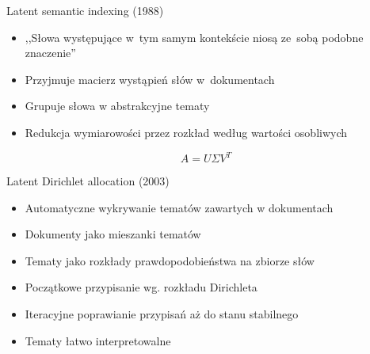 \documentclass{beamer}
\begin{document}
	\begin{frame}{Latent semantic indexing (1988)}
		\begin{itemize}
			\setlength\itemsep{2em}
			\item ,,Słowa występujące w~tym samym kontekście niosą ze~sobą podobne znaczenie''
			\item Przyjmuje macierz wystąpień słów w~dokumentach
			\item Grupuje słowa w abstrakcyjne tematy
			\item Redukcja wymiarowości przez rozkład według wartości osobliwych
		\end{itemize}
			\begin{equation}
				A = U \Sigma V^T
			\end{equation}
	\end{frame}
	\begin{frame}{Latent Dirichlet allocation (2003)}
		\begin{itemize}
			\setlength\itemsep{2em}
			\item Automatyczne wykrywanie tematów zawartych w dokumentach
			\item Dokumenty jako mieszanki tematów
			\item Tematy jako rozkłady prawdopodobieństwa na zbiorze słów
			\item Początkowe przypisanie wg. rozkładu Dirichleta
			\item Iteracyjne poprawianie przypisań aż do stanu stabilnego
			\item Tematy łatwo interpretowalne
		\end{itemize}
	\end{frame}
\end{document}
